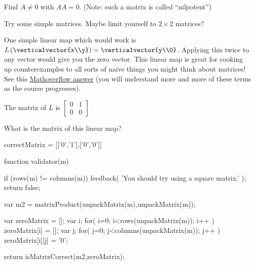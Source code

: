 \documentclass{ximera}
\begin{document}
\begin{question}
  Find $A \neq 0$ with $AA = 0$.  (Note:  such a matrix is called ``nilpotent'')
	\begin{hint}
		Try some simple matrices.  Maybe limit yourself to $2\times2$ matrices?
	\end{hint}
	\begin{hint}
		One simple linear map which would work is $L\left(\verticalvector{x\\y}\right) = \verticalvector{y\\0}$.  Applying this twice to any vector would 
		give you the zero vector.   This linear map is great for cooking up counterexamples to all sorts of naive things you might think about matrices!  See 
		this \href{http://mathoverflow.net/questions/16829/what-are-your-favorite-instructional-counterexamples/16841#16841}{Mathoverflow  answer} (you will understand
		more and more of these terms as the course progresses).
		
		\begin{question}
			\begin{hint}
				The matrix of $L$ is $\begin{bmatrix} 0&1\\0&0 \end{bmatrix}$
			\end{hint}
			What is the matrix of this linear map?
			\begin{matrix-answer}[name=A]
				correctMatrix = [['0','1'],['0','0']]
			\end{matrix-answer}
		\end{question}
	\end{hint}
	
  \begin{solution}
    \begin{matrix-answer}[name=A]
    function validator(m) {
      if (rows(m) != columns(m)) {
        feedback( 'You should try using a square matrix.' );
        return false;
      }
      
      var m2 = matrixProduct(unpackMatrix(m),unpackMatrix(m));
      
      var zeroMatrix = [];
      var i;
      for( i=0; i<rows(unpackMatrix(m)); i++ ) {
        zeroMatrix[i] = [];
        var j;
        for( j=0; j<columns(unpackMatrix(m)); j++ ) {
          zeroMatrix[i][j] = '0';
        }
      }

      return isMatrixCorrect(m2,zeroMatrix);
    }
    \end{matrix-answer}
  \end{solution}
\end{question}
	
\end{document}
